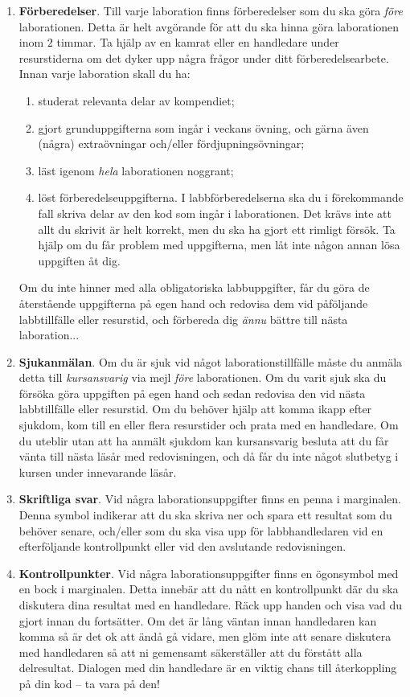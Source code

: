 \begin{enumerate}
\item \textbf{Förberedelser}. Till varje laboration finns förberedelser som du ska göra \emph{före} laborationen. Detta är helt avgörande för att du ska hinna göra laborationen inom $2$ timmar. Ta hjälp av en kamrat eller en handledare under resurstiderna om det dyker upp några frågor under ditt förberedelsearbete. Innan varje laboration skall du ha:

\begin{enumerate}
\item studerat relevanta delar av kompendiet;
\item gjort grunduppgifterna som ingår i veckans övning, och gärna även (några) extraövningar och/eller fördjupningsövningar;
\item läst igenom \emph{hela} laborationen noggrant;
\item löst förberedelseuppgifterna. I labbförberedelserna ska du i förekommande fall skriva delar av den kod som ingår i laborationen. Det krävs inte att allt du skrivit är helt korrekt, men du ska ha gjort ett rimligt försök. Ta hjälp om du får problem med uppgifterna, men låt inte någon annan lösa uppgiften åt dig.
\end{enumerate}

Om du inte hinner med alla obligatoriska labbuppgifter, får du göra de återstående uppgifterna på egen hand och redovisa dem vid påföljande labbtillfälle eller resurstid, och förbereda dig \emph{ännu} bättre till nästa laboration...

\item \textbf{Sjukanmälan}. Om du är sjuk vid något laborationstillfälle måste du anmäla detta till \emph{kursansvarig} via mejl \emph{före} laborationen. Om du varit sjuk ska du försöka göra uppgiften på egen hand och sedan redovisa den vid nästa labbtillfälle eller resurstid. Om du behöver hjälp att komma ikapp efter sjukdom, kom till en eller flera resurstider och prata med en handledare. Om du uteblir utan att ha anmält sjukdom kan kursansvarig besluta att du får vänta till nästa läsår med redovisningen, och då får du inte något slutbetyg i kursen under innevarande läsår.

\item\Pen \textbf{Skriftliga svar}. Vid några laborationsuppgifter finns en penna i marginalen. Denna symbol indikerar att du ska skriva ner och spara ett resultat som du behöver senare, och/eller som du ska visa upp för labbhandledaren vid en efterföljande kontrollpunkt eller vid den avslutande redovisningen.

\item\Checkpoint \textbf{Kontrollpunkter}. Vid några laborationsuppgifter finns en ögonsymbol med en bock i marginalen. Detta innebär att du nått en kontrollpunkt där du ska diskutera dina resultat med en handledare. Räck upp handen och visa vad du gjort innan du fortsätter. Om det är lång väntan innan  handledaren kan komma så är det ok att ändå gå vidare, men glöm inte att senare diskutera med handledaren så att ni gemensamt säkerställer att du förstått alla delresultat. Dialogen med din handledare är en viktig chans till återkoppling på din kod -- ta vara på den!

\end{enumerate}

